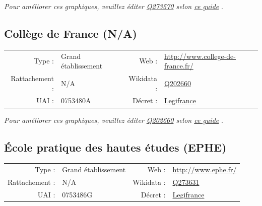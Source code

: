 \documentclass[12pt,french,landscape]{article}
\begin{document}
\textit{\scriptsize Pour améliorer ces graphiques, veuillez éditer \href{https://www.wikidata.org/entity/Q273570}{Q273570}  selon \href{https://github.com/cpesr/wikidataESR/blob/master/Rmd/wikidataESR.md}{ce guide}}
.


\newpage

\hypertarget{colluxe8ge-de-france-na}{%
\subsection{Collège de France (N/A)}\label{colluxe8ge-de-france-na}}

\begin{tabular*}{0.45\textwidth}{rp{2cm}rl}  
\hline  
Type : & Grand établissement & Web : &\href{http://www.college-de-france.fr/}{http://www.college-de-france.fr/} \\  
Rattachement : & N/A & Wikidata : & \href{https://www.wikidata.org/entity/Q202660}{Q202660} \\  
UAI : & 0753480A & Décret : & \href{http://www.legifrance.gouv.fr/affichTexte.do?dateTexte=&categorieLien=id&cidTexte=JORFTEXT000000350825&fastPos=2&fastReqId=1763095596&oldAction=rechExpTexteJorf}{Legifrance} \\  
\hline  
\end{tabular*}

\textit{\scriptsize Pour améliorer ces graphiques, veuillez éditer \href{https://www.wikidata.org/entity/Q202660}{Q202660}  selon \href{https://github.com/cpesr/wikidataESR/blob/master/Rmd/wikidataESR.md}{ce guide}}
.


\newpage

\hypertarget{uxe9cole-pratique-des-hautes-uxe9tudes-ephe}{%
\subsection{École pratique des hautes études
(EPHE)}\label{uxe9cole-pratique-des-hautes-uxe9tudes-ephe}}

\begin{tabular*}{0.45\textwidth}{rp{2cm}rl}  
\hline  
Type : & Grand établissement & Web : &\href{http://www.ephe.fr/}{http://www.ephe.fr/} \\  
Rattachement : & N/A & Wikidata : & \href{https://www.wikidata.org/entity/Q273631}{Q273631} \\  
UAI : & 0753486G & Décret : & \href{https://www.legifrance.gouv.fr/affichTexte.do?cidTexte=JORFTEXT000032490129&dateTexte=&categorieLien=id}{Legifrance} \\  
\hline  
\end{tabular*}
\end{document}
